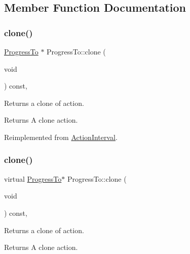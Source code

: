 \subsection{Member Function Documentation}
\mbox{\label{classProgressTo_a55a418dbd387fca470d425df87291b0b}} 
\subsubsection{\texorpdfstring{clone()}{clone()}\hspace{0.1cm}{\footnotesize\ttfamily [1/2]}}
{\footnotesize\ttfamily \hyperlink{classProgressTo}{Progress\+To} $\ast$ Progress\+To\+::clone (\begin{DoxyParamCaption}\item[{void}]{ }\end{DoxyParamCaption}) const\hspace{0.3cm}{\ttfamily [override]}, {\ttfamily [virtual]}}

Returns a clone of action.

\begin{DoxyReturn}{Returns}
A clone action. 
\end{DoxyReturn}


Reimplemented from \hyperlink{classActionInterval_abc93ce0c2f54a90eb216a7803f25f44a}{Action\+Interval}.

\mbox{\label{classProgressTo_a993bf559112f3bbe3f4d38027711fd8e}} 
\subsubsection{\texorpdfstring{clone()}{clone()}\hspace{0.1cm}{\footnotesize\ttfamily [2/2]}}
{\footnotesize\ttfamily virtual \hyperlink{classProgressTo}{Progress\+To}$\ast$ Progress\+To\+::clone (\begin{DoxyParamCaption}\item[{void}]{ }\end{DoxyParamCaption}) const\hspace{0.3cm}{\ttfamily [override]}, {\ttfamily [virtual]}}

Returns a clone of action.

\begin{DoxyReturn}{Returns}
A clone action. 
\end{DoxyReturn}


